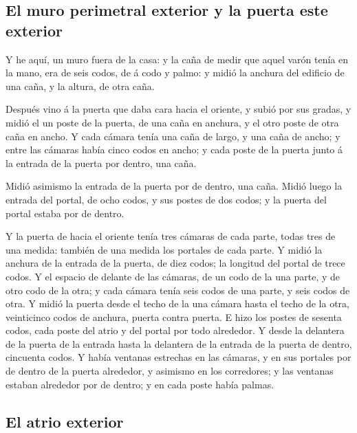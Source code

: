 \hypertarget{el-muro-perimetral-exterior-y-la-puerta-este-exterior}{%
\subsection{El muro perimetral exterior y la puerta este
exterior}\label{el-muro-perimetral-exterior-y-la-puerta-este-exterior}}

 Y he aquí, un muro fuera de la casa: y la caña de medir que
aquel varón tenía en la mano, era de seis codos, de á codo y palmo: y
midió la anchura del edificio de una caña, y la altura, de otra caña.

 Después vino á la puerta que daba cara hacia el oriente, y
subió por sus gradas, y midió el un poste de la puerta, de una caña en
anchura, y el otro poste de otra caña en ancho.  Y cada
cámara tenía una caña de largo, y una caña de ancho; y entre las cámaras
había cinco codos en ancho; y cada poste de la puerta junto á la entrada
de la puerta por dentro, una caña.

 Midió asimismo la entrada de la puerta por de dentro, una
caña.  Midió luego la entrada del portal, de ocho codos, y
sus postes de dos codos; y la puerta del portal estaba por de dentro.

 Y la puerta de hacia el oriente tenía tres cámaras de cada
parte, todas tres de una medida: también de una medida los portales de
cada parte.  Y midió la anchura de la entrada de la puerta,
de diez codos; la longitud del portal de trece codos.  Y el
espacio de delante de las cámaras, de un codo de la una parte, y de otro
codo de la otra; y cada cámara tenía seis codos de una parte, y seis
codos de otra.  Y midió la puerta desde el techo de la una
cámara hasta el techo de la otra, veinticinco codos de anchura, puerta
contra puerta.  E hizo los postes de sesenta codos, cada
poste del atrio y del portal por todo alrededor.  Y desde
la delantera de la puerta de la entrada hasta la delantera de la entrada
de la puerta de dentro, cincuenta codos.  Y había ventanas
estrechas en las cámaras, y en sus portales por de dentro de la puerta
alrededor, y asimismo en los corredores; y las ventanas estaban
alrededor por de dentro; y en cada poste había palmas.

\hypertarget{el-atrio-exterior}{%
\subsection{El atrio exterior}\label{el-atrio-exterior}}

